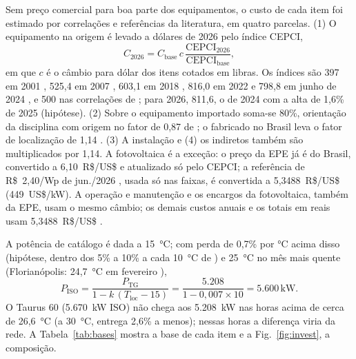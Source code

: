 \documentclass[10pt,a4paper,twocolumn]{article}
\newcommand{\un}[1]{\,\mathrm{#1}}
\begin{document}
Sem preço comercial para boa parte dos equipamentos, o custo de cada item foi estimado por correlações e referências da literatura, em quatro parcelas. (1) O equipamento na origem é levado a dólares de 2026 pelo índice CEPCI,
\begin{equation}
C_{2026} = C_{\text{base}}\, c\, \frac{\mathrm{CEPCI}_{2026}}{\mathrm{CEPCI}_{\text{base}}}, \label{eq:cepci}
\end{equation}
em que $c$ é o câmbio para dólar dos itens cotados em libras. Os índices são 397 em 2001 \cite{turton2018}, 525,4 em 2007 \cite{chemeng2026}, 603,1 em 2018 \cite{venturini2021}, 816,0 em 2022 e 798,8 em junho de 2024 \cite{toweringskills}, e 500 nas correlações de \cite{seider2017}; para 2026, 811,6, o de 2024 com a alta de 1,6\% de 2025 \cite{cepci2026} (hipótese). (2) Sobre o equipamento importado soma-se 80\%, orientação da disciplina com origem no fator de 0,87 de \cite{izidoro2016}; o fabricado no Brasil leva o fator de localização de 1,14 \cite{towler2022}. (3) A instalação e (4) os indiretos também são multiplicados por 1,14. A fotovoltaica é a exceção: o preço da EPE já é do Brasil, convertido a 6,10~R\$/US\$ e atualizado só pelo CEPCI; a referência de R\$~2,40/Wp de jun./2026 \cite{greener2026}, usada só nas faixas, é convertida a 5,3488~R\$/US\$ (449~US\$/kW). A operação e manutenção e os encargos da fotovoltaica, também da EPE, usam o mesmo câmbio; os demais custos anuais e os totais em reais usam 5,3488~R\$/US\$ \cite{agrolink2026}.

A potência de catálogo é dada a 15~°C; com perda de 0,7\% por °C acima disso (hipótese, dentro dos 5\% a 10\% a cada 10~°C de \cite{wartsila}) e 25~°C no mês mais quente (Florianópolis: 24,7~°C em fevereiro \cite{embrapa}),
\begin{equation}
P_{\text{ISO}} = \frac{P_{\text{TG}}}{1 - k\,(T_{\text{loc}} - 15)} = \frac{5.208}{1 - 0{,}007 \times 10} = 5.600\un{kW}. \label{eq:piso}
\end{equation}
O Taurus 60 (5.670~kW ISO) não chega aos 5.208~kW nas horas acima de cerca de 26,6~°C (a 30~°C, entrega 2,6\% a menos); nessas horas a diferença viria da rede. A Tabela~\ref{tab:bases} mostra a base de cada item e a Fig.~\ref{fig:invest}, a composição.
\end{document}
